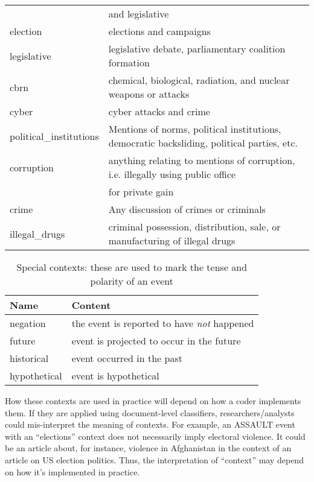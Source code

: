 \documentclass[11pt]{report}
\newcommand{\plcat}[1]{\textsf{#1}}
\begin{document}
\begin{table}[htp]
\begin{center}
\begin{tabular}{|l|l|}
&\hspace{6pt} and legislative \\
election & elections and campaigns \\
legislative & legislative debate, parliamentary coalition formation \\
cbrn & chemical, biological, radiation, and nuclear weapons or attacks  \\
cyber & cyber attacks and crime\\
political\_institutions & Mentions of norms, political institutions, democratic backsliding, political parties, etc. \\
corruption & anything relating to mentions of corruption, i.e. illegally using public office \\
&\hspace{6pt} for private gain \\
crime & Any discussion of crimes or criminals \\
illegal\_drugs & criminal possession, distribution, sale, or manufacturing of illegal drugs \\
\hline
\end{tabular}
\end{center}
\label{tab:context}
\end{table}

\begin{table}[htp]
\caption{Special contexts: these are used to mark the tense and polarity of an event }
\begin{center}
\begin{tabular}{|l|l|}
\hline
Name & Content \\
\hline
negation & the event is reported to have \emph{not} happened \\
future & event is projected to occur in the future\\
historical & event occurred in the past\\
hypothetical & event is hypothetical\\
\hline
\end{tabular}
\end{center}
\label{tab:specialcontext}
\end{table}

How these contexts are used in practice will depend on how a coder implements them. If they are applied using document-level classifiers, researchers/analysts could mis-interpret the meaning of contexts. For example, an \plcat{ASSAULT} event with an ``elections'' context does not necessarily imply electoral violence. It could be an article about, for instance, violence in Afghanistan in the context of an article on US election politics. Thus, the interpretation of ``context'' may depend on how it's implemented in practice.
\end{document}
